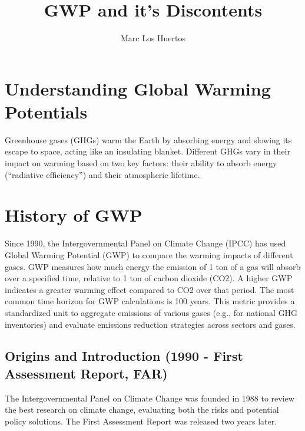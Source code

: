 \documentclass{tufte-handout}\usepackage[]{graphicx}\usepackage[]{xcolor}
\title{GWP and it's Discontents}
\author{Marc Los Huertos}
\begin{document}
\maketitle

\section{Understanding Global Warming Potentials}

Greenhouse gases (GHGs) warm the Earth by absorbing energy and slowing its escape to space, acting like an insulating blanket. Different GHGs vary in their impact on warming based on two key factors: their ability to absorb energy (``radiative efficiency'') and their atmospheric lifetime.

\section{History of GWP}

Since 1990, the Intergovernmental Panel on Climate Change (IPCC) has used Global Warming Potential (GWP) to compare the warming impacts of different gases. GWP measures how much energy the emission of 1 ton of a gas will absorb over a specified time, relative to 1 ton of carbon dioxide (CO2). A higher GWP indicates a greater warming effect compared to CO2 over that period. The most common time horizon for GWP calculations is 100 years. This metric provides a standardized unit to aggregate emissions of various gases (e.g., for national GHG inventories) and evaluate emissions reduction strategies across sectors and gases.


\subsection{Origins and Introduction (1990 - First Assessment Report, FAR)}

The Intergovernmental Panel on Climate Change was founded in 1988 to review the best research on climate change, evaluating both the risks and potential policy solutions. The First Assessment Report was released two years later.
\end{document}
